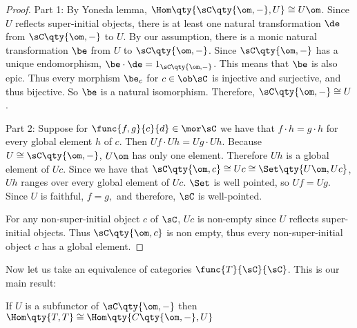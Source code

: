 \documentclass[main.tex]{subfiles}
\begin{document}
\begin{proof}
	
	Part 1:
	By Yoneda lemma, $\Hom\qty{\sC\qty{\om,-},U} \cong U\om$. Since $U$ 
	reflects super-initial objects, there is at least one natural 
	transformation $\de$ from $\sC\qty{\om,-}$ to $U$. By our assumption, there 
	is a monic natural transformation $\be$ from $U$ to $\sC\qty{\om,-}$. Since 
	$\sC\qty{\om,-}$ has a unique endomorphism, $\be \cdot \de = 
	1_{\sC\qty{\om,-}}$. This means that $\be$ is also epic. Thus every 
	morphism $\be_{c}$ for $c \in \ob \sC$ is injective and surjective, and 
	thus bijective. So $\be$ is a natural isomorphism. Therefore, 
	$\sC\qty{\om,-} \cong U$.
	
	Part 2: Suppose for $\func{f,g}{c}{d} \in \mor \sC$ we have that $f \cdot h 
	= g \cdot h$ for every global element $h$ of $c$. Then $Uf \cdot Uh = Ug 
	\cdot Uh.$ Because $U \cong \sC\qty{\om,-}$, $U\om$ has only one element. 
	Therefore $Uh$ is a global element of $Uc$. Since we have that $\sC\qty{\om,c} 
	\cong Uc \cong \Set\qty{U\om,Uc}$, $Uh$ ranges over every global 
	element of $Uc$. $\Set$ is well pointed, so $Uf = Ug$. Since $U$ is 
	faithful, $f = g,$ and therefore, $\sC$ is well-pointed.
	
	For any non-super-initial object $c$ of $\sC$, $Uc$ is non-empty since $U$ 
	reflects super-initial objects. Thus $\sC\qty{\om,c}$ is non empty, thus 
	every non-super-initial object $c$ has a global element.
	
	
\end{proof}

Now let us take an equivalence of categories $\func{T}{\sC}{\sC}$. This is our main result:

\begin{theorem}
	
If $U $ is a subfunctor of  $\sC\qty{\om,-}$ then $\Hom\qty{T,T} \cong 
\Hom\qty{C\qty{\om,-},U }$	
	
\end{theorem}	
\end{document}
